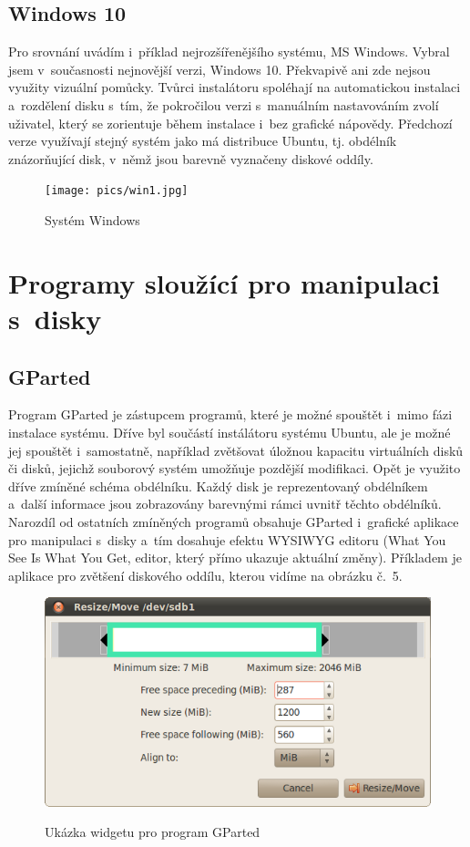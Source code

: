 \documentclass[color,table,oneside,nolot,nolof]{fithesis}
\begin{document}
\subsection{Windows 10}

Pro srovnání uvádím i~příklad nejrozšířenějšího systému, MS Windows. Vybral jsem v~současnosti nejnovější verzi, Windows 10. Překvapivě ani zde nejsou využity vizuální pomůcky.
Tvůrci instalátoru spoléhají na automatickou instalaci a~rozdělení disku s~tím, že pokročilou verzi s~manuálním nastavováním zvolí uživatel, který se zorientuje během instalace i~bez grafické nápovědy. 
Předchozí verze využívají stejný systém jako má distribuce Ubuntu, tj. obdélník znázorňující disk, v~němž jsou barevně vyznačeny diskové oddíly.

\begin{figure}[h!]
	\label{fig:win}
	\caption{Systém Windows}
	\centering
	\texttt{[image: pics/win1.jpg]}
\end{figure}

\section{Programy sloužící pro manipulaci s~disky}

\subsection{GParted}

Program GParted je zástupcem programů, které je možné spouštět i~mimo fázi instalace systému. Dříve byl součástí instálátoru systému Ubuntu, ale je možné jej spouštět i~samostatně, například 
 zvětšovat úložnou kapacitu virtuálních disků či disků, jejichž souborový systém umožňuje pozdější modifikaci. Opět je využito dříve zmíněné schéma obdélníku. Každý disk je reprezentovaný 
 obdélníkem a~další informace jsou zobrazovány barevnými rámci uvnitř těchto obdélníků. Narozdíl od ostatních zmíněných programů obsahuje GParted i~grafické aplikace pro manipulaci s~disky 
 a~tím dosahuje efektu WYSIWYG editoru (What You See Is What You Get, editor, který přímo ukazuje aktuální změny). Příkladem je aplikace pro zvětšení diskového oddílu, kterou vidíme na obrázku č.~5.

 \begin{figure}[h!]
	 \label{fig:gparted}
	 \caption{Ukázka widgetu pro program GParted~\cite{GParted}}
	 \centering
	 \includegraphics[width=.6\columnwidth]{pictures/gparted-5-big.png}\\
 \end{figure}
\end{document}

